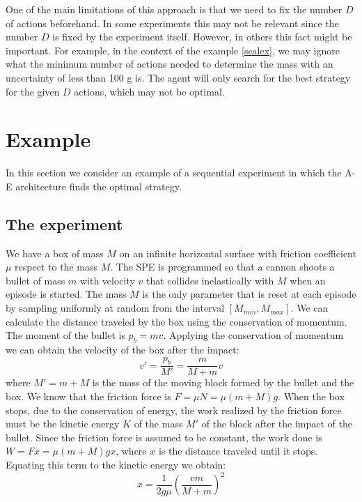 \documentclass[11pt,a4paper,twoside]{report}
\newcommand{\+}{\textnormal{+} }
\theoremstyle{definition}
\numberwithin{equation}{chapter}
\begin{document}
One of the main limitations of this approach is that we need to fix the number
$D$ of actions beforehand. In some experiments this may not be relevant since
the number $D$ is fixed by the experiment itself. However, in others this fact
might be important. For example, in the context of the example \ref{scalex}, we
may ignore what the minimum number of actions needed to determine the mass
with an uncertainty of less than 100 g is. The agent will only search for the best
strategy for the given $D$ actions, which may not be optimal.


\section{Example}

In this section we consider an example of a sequential experiment
in which the A-E architecture finds the optimal strategy.

\subsection{The experiment}

We have a box of mass $M$ on an infinite horizontal surface with friction
coefficient $\mu$ respect to the mass $M$. The SPE is programmed so that a
cannon shoots a bullet of mass $m$ with velocity $v$ that collides inelastically
with $M$ when an episode is started. The mass $M$ is the only parameter that is
reset at each episode by sampling uniformly at random from the interval
$[M_{min}, M_{max}]$. We can calculate the distance traveled by the box using
the conservation of momentum. The moment of the bullet is $p_b=mv$. Applying the
conservation of momentum we can obtain the velocity of the box after the impact:
\begin{equation}
  v' = \frac{p_b}{M'}=\frac{m}{M+m}v
\end{equation}
where $M'=m+M$ is the mass of the moving block formed by the bullet and the box.
 We know that the friction force is $F=\mu N=\mu (m+M)g$. When the box stops,
 due to the conservation of energy, the work realized by the friction force must
 be the kinetic energy $K$ of the mass $M'$ of the block after the impact of the
 bullet. Since the friction force is assumed to be constant, the work done is
 $W=Fx=\mu (m+M)gx$, where $x$ is the distance traveled until it stops. Equating
 this term to the kinetic energy we obtain:
\begin{equation}
  \label{displacement} 
  x=\frac{1}{2g\mu}\left(\frac{vm}{M+m} \right)^2
\end{equation}
\end{document}
